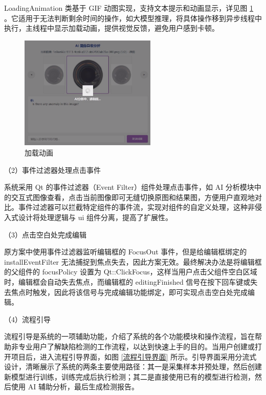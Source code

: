 \documentclass[
  ]{njuthesis}
\begin{document}
LoadingAnimation 类基于 GIF 动图实现，支持文本提示和动画显示，详见图 \ref{加载动画} 。它适用于无法判断剩余时间的操作，如大模型推理，将具体操作移到异步线程中执行，主线程中显示加载动画，提供视觉反馈，避免用户感到卡顿。

\begin{figure}[htb]
    \centering
    \includegraphics[width=0.58\textwidth]{images/加载动画.png}
    \caption{加载动画}
    \label{加载动画}
\end{figure}

（2）事件过滤器处理点击事件

系统采用 Qt 的事件过滤器（Event Filter）组件处理点击事件，如 AI 分析模块中的交互式图像查看，点击当前图像即可无缝切换原图和结果图，方便用户直观地对比。事件过滤器可以拦截特定组件的事件流，实现对组件的自定义处理，这种非侵入式设计将处理逻辑与 ui 组件分离，提高了扩展性。

（3）点击空白处完成编辑

原方案中使用事件过滤器监听编辑框的 FocusOut 事件，但是给编辑框绑定的 installEventFilter 无法捕捉到焦点失去，因此方案无效。最终解决办法是将编辑框的父组件的 focusPolicy 设置为 Qt::ClickFocus，这样当用户点击父组件空白区域时，编辑框会自动失去焦点，而编辑框的 editingFinished 信号在按下回车键或失去焦点时触发，因此将该信号与完成编辑功能绑定，即可实现点击空白处完成编辑。

（4）流程引导

流程引导是系统的一项辅助功能，介绍了系统的各个功能模块和操作流程，旨在帮助非专业用户了解缺陷检测的工作流程，以达到快速上手的目的。当用户创建或打开项目后，进入流程引导界面，如图 \ref{流程引导界面} 所示。引导界面采用分流式设计，清晰展示了系统的两条主要使用路径：其一是采集样本并预处理，然后创建新模型进行训练，训练完成后执行检测；其二是直接使用已有的模型进行检测，然后使用 AI 辅助分析，最后生成检测报告。
\end{document}
